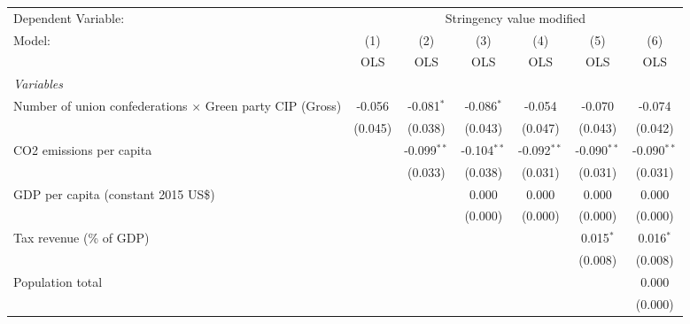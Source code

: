 
\begingroup
\centering
\begin{tabular}{lcccccc}
   \toprule
   Dependent Variable: & \multicolumn{6}{c}{Stringency value modified}\\
   Model:                                                           & (1)     & (2)           & (3)           & (4)           & (5)           & (6)\\  
                                                                    &  OLS    & OLS           & OLS           & OLS           & OLS           & OLS\\  
   \midrule
   \emph{Variables}\\
   Number of union confederations $\times$ Green party CIP (Gross)  & -0.056  & -0.081$^{*}$  & -0.086$^{*}$  & -0.054        & -0.070        & -0.074\\   
                                                                    & (0.045) & (0.038)       & (0.043)       & (0.047)       & (0.043)       & (0.042)\\   
   CO2 emissions per capita                                         &         & -0.099$^{**}$ & -0.104$^{**}$ & -0.092$^{**}$ & -0.090$^{**}$ & -0.090$^{**}$\\   
                                                                    &         & (0.033)       & (0.038)       & (0.031)       & (0.031)       & (0.031)\\   
   GDP per capita (constant 2015 US\$)                              &         &               & 0.000         & 0.000         & 0.000         & 0.000\\   
                                                                    &         &               & (0.000)       & (0.000)       & (0.000)       & (0.000)\\   
   Tax revenue (\% of GDP)                                          &         &               &               &               & 0.015$^{*}$   & 0.016$^{*}$\\   
                                                                    &         &               &               &               & (0.008)       & (0.008)\\   
   Population total                                                 &         &               &               &               &               & 0.000\\   
                                                                    &         &               &               &               &               & (0.000)\\   

\end{tabular}
